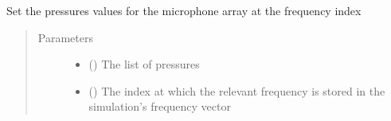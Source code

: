 \documentclass[letterpaper,10pt,english]{sphinxmanual}
\begin{document}
\begin{fulllineitems}
\begin{fulllineitems}
\begin{quote}
\begin{description}
\end{description}\end{quote}

\end{fulllineitems}


\begin{fulllineitems}
\label{\detokenize{source/pyzones:pyzones.MicrophoneArray.set_pressures}}
Set the pressures values for the microphone array at the frequency index
\begin{quote}\begin{description}
\item[{Parameters}] \leavevmode\begin{itemize}
\item {} 
 () \textendash{} The list of pressures

\item {} 
 () \textendash{} The index at which the relevant frequency is stored in the simulation’s frequency vector

\end{itemize}

\end{description}\end{quote}

\end{fulllineitems}


\end{fulllineitems}

\end{document}
